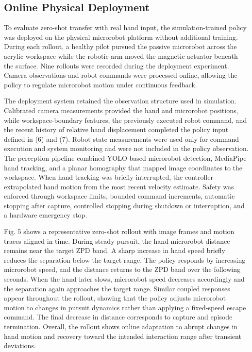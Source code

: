 \documentclass[letterpaper,journal]{IEEEtran}
\begin{document}
\subsection{Online Physical Deployment}
To evaluate zero-shot transfer with real hand input, the simulation-trained policy was deployed on the physical microrobot platform without additional training. During each rollout, a healthy pilot pursued the passive microrobot across the acrylic workspace while the robotic arm moved the magnetic actuator beneath the surface. Nine rollouts were recorded during the deployment experiment. Camera observations and robot commands were processed online, allowing the policy to regulate microrobot motion under continuous feedback.

The deployment system retained the observation structure used in simulation. Calibrated camera measurements provided the hand and microrobot positions, while workspace-boundary features, the previously executed robot command, and the recent history of relative hand displacement completed the policy input defined in (6) and (7). Robot state measurements were used only for command execution and system monitoring and were not included in the policy observation. The perception pipeline combined YOLO-based microrobot detection, MediaPipe hand tracking, and a planar homography that mapped image coordinates to the workspace. When hand tracking was briefly interrupted, the controller extrapolated hand motion from the most recent velocity estimate. Safety was enforced through workspace limits, bounded command increments, automatic stopping after capture, controlled stopping during shutdown or interruption, and a hardware emergency stop.

Fig. 5 shows a representative zero-shot rollout with image frames and motion traces aligned in time. During steady pursuit, the hand-microrobot distance remains near the target ZPD band. A sharp increase in hand speed briefly reduces the separation below the target range. The policy responds by increasing microrobot speed, and the distance returns to the ZPD band over the following seconds. When the hand later slows, microrobot speed decreases accordingly and the separation again approaches the target range. Similar coupled responses appear throughout the rollout, showing that the policy adjusts microrobot motion to changes in pursuit dynamics rather than applying a fixed-speed escape command. The final decrease in distance corresponds to capture and episode termination. Overall, the rollout shows online adaptation to abrupt changes in hand motion and recovery toward the intended interaction range after transient deviations.
\end{document}
